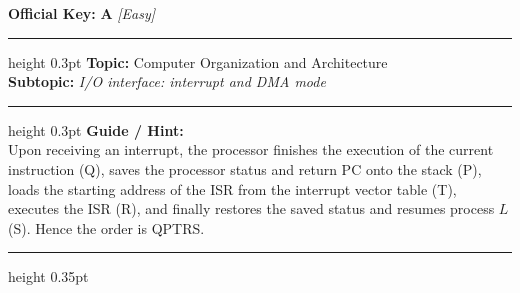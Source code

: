 \documentclass[a4paper,10pt]{article}
\begin{document}
\begin{tcolorbox}
\textbf{Official Key:} \textbf{\large A} \hfill \textit{\small [Easy]}
\vspace{2pt}\hrule height 0.3pt\vspace{3pt}
\textbf{Topic:} Computer Organization and Architecture \\
\textbf{Subtopic:} \textit{I/O interface: interrupt and DMA mode}
\vspace{2pt}\hrule height 0.3pt\vspace{3pt}
\textbf{Guide / Hint:} \\
{\small Upon receiving an interrupt, the processor finishes the execution of the current instruction (Q), saves the processor status and return PC onto the stack (P), loads the starting address of the ISR from the interrupt vector table (T), executes the ISR (R), and finally restores the saved status and resumes process $L$ (S). Hence the order is QPTRS.}

\end{tcolorbox}
\vspace{6pt}\hrule height 0.35pt\vspace{6pt}
\noindent
\end{document}
